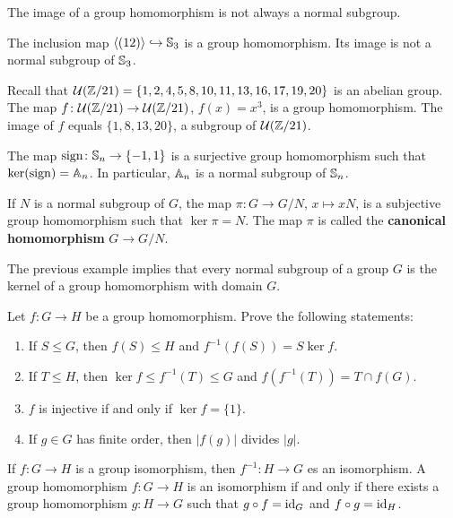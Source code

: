 The image of a group homomorphism
is not always a normal subgroup. 

\begin{example}
The inclusion map $\langle (12)\rangle\hookrightarrow\mathbb{S}_3$ is a group
homomorphism. Its image is not a normal subgroup of $\mathbb{S}_3$.
\end{example}

\begin{example}
Recall that $\mathcal{U}(\mathbb{Z}/21)=\{1,2,4,5,8,10,11,13,16,17,19,20\}$ is an abelian group. The map 
$f\colon\mathcal{U}(\mathbb{Z}/21)\to\mathcal{U}(\mathbb{Z}/21)$, $f(x)=x^3$, is a group
homomorphism. The image of 
$f$ equals $\{1,8,13,20\}$, a subgroup of $\mathcal{U}(\mathbb{Z}/21)$.
\end{example}

\begin{example}
The map $\operatorname{sign}\colon\mathbb{S}_n\to\{-1,1\}$ is a surjective group 
homomorphism such that  
$\ker(\operatorname{sign})=\mathbb{A}_n$. In particular, $\mathbb{A}_n$ is a normal subgroup of $\mathbb{S}_n$.
\end{example}

\begin{example}
If $N$ is a normal subgroup of $G$, the map $\pi\colon G\to G/N$, $x\mapsto xN$, is a subjective group homomorphism such that 
$\ker\pi=N$. The map $\pi$ is called 
the \textbf{canonical homomorphism} $G\to G/N$.
\end{example}

The previous example implies that 
every normal subgroup of a group $G$ is the kernel of a group
homomorphism with domain $G$. 


\begin{exercise}
Let $f\colon G\to H$ be a group homomorphism. 
Prove the following statements:
\begin{enumerate}
\item If $S\leq G$, then $f(S)\leq H$ and $f^{-1}(f(S))=S\ker f$.
\item If $T\leq H$, then $\ker f\leq f^{-1}(T)\leq G$ and $f(f^{-1}(T))=T\cap f(G)$.
\item $f$ is injective if and only if $\ker f=\{1\}$.
\item If $g\in G$ has finite order, then $|f(g)|$ divides $|g|$.
\end{enumerate}
\end{exercise}

If $f\colon G\to H$ is a group isomorphism, then
$f^{-1}\colon H\to G$ es an isomorphism. A group
homomorphism $f\colon G\to H$ is an isomorphism
if and only if there exists a group homomorphism 
$g\colon H\to G$ such that $g\circ f=\operatorname{id}_G$ and $f\circ g=\operatorname{id}_H$.

